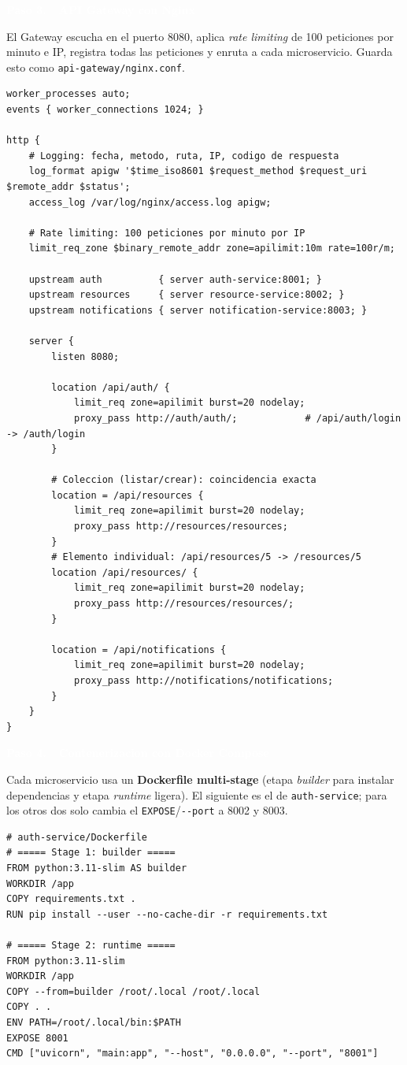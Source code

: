 \documentclass[11pt]{article}
\newcommand{\pasohead}[2]{%
\vspace{4pt}%
\begin{tcolorbox}[colback=azulMedio,colframe=azulMedio,boxrule=0pt,arc=2pt,left=8pt,right=8pt,top=4pt,bottom=4pt]
\textcolor{white}{\textbf{Paso #1.\ \ #2}}\end{tcolorbox}}
\begin{document}
\pasohead{3}{API Gateway con Nginx}
El Gateway escucha en el puerto 8080, aplica \emph{rate limiting} de 100 peticiones por minuto e IP, registra todas las peticiones y enruta a cada microservicio. Guarda esto como \texttt{api-gateway/nginx.conf}.

\begin{lstlisting}
worker_processes auto;
events { worker_connections 1024; }

http {
    # Logging: fecha, metodo, ruta, IP, codigo de respuesta
    log_format apigw '$time_iso8601 $request_method $request_uri $remote_addr $status';
    access_log /var/log/nginx/access.log apigw;

    # Rate limiting: 100 peticiones por minuto por IP
    limit_req_zone $binary_remote_addr zone=apilimit:10m rate=100r/m;

    upstream auth          { server auth-service:8001; }
    upstream resources     { server resource-service:8002; }
    upstream notifications { server notification-service:8003; }

    server {
        listen 8080;

        location /api/auth/ {
            limit_req zone=apilimit burst=20 nodelay;
            proxy_pass http://auth/auth/;            # /api/auth/login -> /auth/login
        }

        # Coleccion (listar/crear): coincidencia exacta
        location = /api/resources {
            limit_req zone=apilimit burst=20 nodelay;
            proxy_pass http://resources/resources;
        }
        # Elemento individual: /api/resources/5 -> /resources/5
        location /api/resources/ {
            limit_req zone=apilimit burst=20 nodelay;
            proxy_pass http://resources/resources/;
        }

        location = /api/notifications {
            limit_req zone=apilimit burst=20 nodelay;
            proxy_pass http://notifications/notifications;
        }
    }
}
\end{lstlisting}

\pasohead{4}{Contenerizacion con Docker Compose}
Cada microservicio usa un \textbf{Dockerfile multi-stage} (etapa \emph{builder} para instalar dependencias y etapa \emph{runtime} ligera). El siguiente es el de \texttt{auth-service}; para los otros dos solo cambia el \texttt{EXPOSE}/\texttt{-{}-port} a 8002 y 8003.

\begin{lstlisting}
# auth-service/Dockerfile
# ===== Stage 1: builder =====
FROM python:3.11-slim AS builder
WORKDIR /app
COPY requirements.txt .
RUN pip install --user --no-cache-dir -r requirements.txt

# ===== Stage 2: runtime =====
FROM python:3.11-slim
WORKDIR /app
COPY --from=builder /root/.local /root/.local
COPY . .
ENV PATH=/root/.local/bin:$PATH
EXPOSE 8001
CMD ["uvicorn", "main:app", "--host", "0.0.0.0", "--port", "8001"]
\end{lstlisting}
\end{document}
